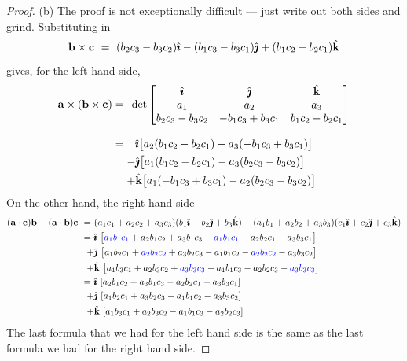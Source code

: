\begin{proof}
\noindent (b)
The proof is not exceptionally difficult --- just write out both sides and grind.
Substituting in
\begin{equation*}
\mathbf{b}\times\mathbf{c}
\ =\ (b_2c_3-b_3c_2)\hat{\pmb{\imath}}-(b_1c_3-b_3c_1)\hat{\pmb{\jmath}} + (b_1c_2-b_2c_1)\hat{\mathbf{k}}
\end{equation*}
gives, for the left hand side,
\begin{align*}
\mathbf{a}\times(\mathbf{b}\times\mathbf{c})
=\phantom{-}&\!\!\!\det\left[\begin{matrix}\hat{\pmb{\imath}}&\hat{\pmb{\jmath}} &\hat{\mathbf{k}}\\
                     a_1&a_2&a_3\\
                     b_2c_3-b_3c_2&-b_1c_3+b_3c_1&b_1c_2-b_2c_1
                     \end{matrix}\right]\\[0.1in]
=\phantom{-}&\hat{\pmb{\imath}}\big[a_2(b_1c_2-b_2c_1)-a_3(-b_1c_3+b_3c_1)\big]\\
-&\hat{\pmb{\jmath}}\big[a_1(b_1c_2-b_2c_1)-a_3(b_2c_3-b_3c_2)\big]\\
+&\hat{\mathbf{k}}\big[a_1(-b_1c_3+b_3c_1)-a_2(b_2c_3-b_3c_2)\big]
\end{align*}
On the other hand, the right hand side
\begin{align*}
(\mathbf{a}\cdot\mathbf{c})\mathbf{b}-(\mathbf{a}\cdot\mathbf{b})\mathbf{c}
\ =\ &(a_1c_1+a_2c_2+a_3c_3)(b_1\hat{\pmb{\imath}}+b_2\hat{\pmb{\jmath}}+b_3\hat{\mathbf{k}})
-(a_1b_1+a_2b_2+a_3b_3)(c_1\hat{\pmb{\imath}}+c_2\hat{\pmb{\jmath}}+c_3\hat{\mathbf{k}})\cr
=\ &
\hat{\pmb{\imath}}\ \big[\textcolor{blue}{a_1b_1c_1}
         +a_2b_1c_2+a_3b_1c_3-
         \textcolor{blue}{a_1b_1c_1}
         -a_2b_2c_1-a_3b_3c_1\big]
\\
{+}&\hat{\pmb{\jmath}}\ \big[a_1b_2c_1
      +\textcolor{blue}{a_2b_2c_2}
      +a_3b_2c_3-a_1b_1c_2
      -\textcolor{blue}{a_2b_2c_2}
      -a_3b_3c_2\big]
\cr
{+}&\hat{\mathbf{k}}\ \big[a_1b_3c_1+a_2b_3c_2
          +\textcolor{blue}{a_3b_3c_3}
          -a_1b_1c_3-a_2b_2c_3
          -\textcolor{blue}{a_3b_3c_3}\big]
\\
{=}\ &
\hat{\pmb{\imath}}\ [a_2b_1c_2+a_3b_1c_3-a_2b_2c_1-a_3b_3c_1]
\cr
{+}&\hat{\pmb{\jmath}}\ [a_1b_2c_1+a_3b_2c_3-a_1b_1c_2-a_3b_3c_2]
\cr
{+}&\hat{\mathbf{k}}\ [a_1b_3c_1+a_2b_3c_2-a_1b_1c_3-a_2b_2c_3]
\end{align*}
The last formula that we had for the left hand side is the same as the last formula we had for the right hand side.
\end{proof}



